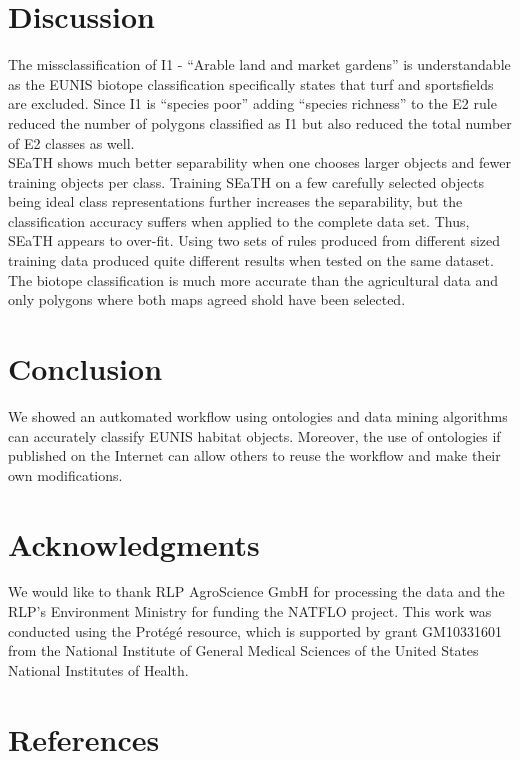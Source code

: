 \documentclass[authoryear, review,12pt,number]{elsarticle}
\begin{document}
\section{Discussion}
The missclassification of I1 - ``Arable land and market gardens'' is 
understandable as the EUNIS biotope classification specifically states that 
turf and sportsfields are excluded. Since I1 is ``species poor'' adding 
``species richness'' to the E2 rule reduced the number of polygons classified 
as I1 but also reduced the total number of E2 classes as well.\\
SEaTH shows much better separability when one chooses
larger objects and fewer training objects per class. Training SEaTH on a few
carefully selected objects being ideal class representations further increases
the separability, but the classification accuracy suffers when applied to the
complete data set. Thus, SEaTH appears to over-fit. Using two sets of rules
produced from different sized training data produced quite different results
when tested on the same dataset.
The biotope classification is much more accurate than the agricultural data and 
only polygons where both maps agreed shold have been selected.
\section{Conclusion} We showed an autkomated
workflow using ontologies and data mining algorithms can accurately classify
EUNIS habitat objects. Moreover, the use of ontologies if published on the
Internet can allow others to reuse the workflow and make their own
modifications. 
\section{Acknowledgments}
We would like to thank RLP AgroScience GmbH for processing the data and the
RLP's Environment Ministry for funding the NATFLO project. This work was
conducted using the Prot\'eg\'e resource, which is supported by grant GM10331601
from the National Institute of General Medical Sciences of the United States
National
Institutes of Health.

\section{References}  
\end{document}
